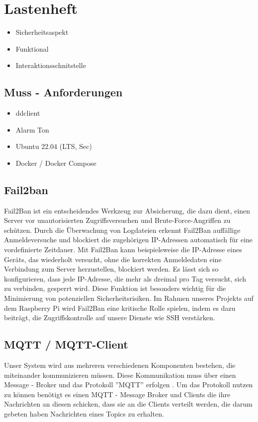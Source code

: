 
\section{Lastenheft}
\begin{itemize}
    \item Sicherheitsaspekt
    \item Funktional 
    \item Interaktionsschnitstelle
\end{itemize}

\subsection{Muss - Anforderungen}
\begin{itemize}
  \item ddclient
  \item Alarm Ton
  \item Ubuntu 22.04 (LTS, Sec)
  \item Docker / Docker Compose
\end{itemize}

\subsection{Fail2ban}
Fail2Ban ist ein entscheidendes Werkzeug zur Absicherung, die dazu dient, einen Server vor unautorisierten Zugriffsversuchen und Brute-Force-Angriffen zu schützen. Durch die Überwachung von Logdateien erkennt Fail2Ban auffällige Anmeldeversuche und blockiert die zugehörigen IP-Adressen automatisch für eine vordefinierte Zeitdauer. Mit Fail2Ban kann beispielsweise die IP-Adresse eines Geräts, das wiederholt versucht, ohne die korrekten Anmeldedaten eine Verbindung zum Server herzustellen, blockiert werden. Es lässt sich so konfigurieren, dass jede IP-Adresse, die mehr als dreimal pro Tag versucht, sich zu verbinden, gesperrt wird. \cite{Fail2ban} Diese Funktion ist besonders wichtig für die Minimierung von potenziellen Sicherheitsrisiken. Im Rahmen unseres Projekts auf dem Raspberry Pi wird Fail2Ban eine kritische Rolle spielen, indem es dazu beiträgt, die Zugriffskontrolle auf unsere Dienste wie SSH verstärken.

\subsection{MQTT / MQTT-Client}
Unser System wird aus mehreren verschiedenen Komponenten bestehen, die miteinander kommunizieren müssen. Diese Kommunikation muss über einen Message - Broker und das Protokoll ''MQTT'' erfolgen \cite{MQTT} . Um das Protokoll nutzen zu können benötigt es einen MQTT - Message Broker und Clients die ihre Nachrichten an diesen schicken, dass sie an die Clients verteilt werden, die darum gebeten haben Nachrichten eines Topics zu erhalten. 


